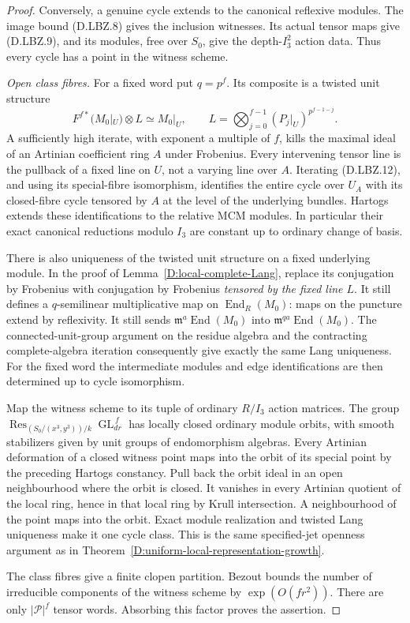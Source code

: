 \begin{proof}
Conversely, a genuine cycle extends to the
canonical reflexive modules.  The image bound
(D.LBZ.8) gives the inclusion witnesses.
Its actual tensor maps give (D.LBZ.9), and
its modules, free over $S_0$, give the
depth-$I_3^2$ action data.  Thus every cycle
has a point in the witness scheme.

\emph{Open class fibres.}
For a fixed word put $q=p^f$.  Its composite is
a twisted unit structure
\[
           F^{f*}(M_0|_U)\otimes L\simeq M_0|_U,
 \qquad
 L=\bigotimes_{j=0}^{f-1}(P_j|_U)^{p^{f-1-j}}.            \tag{D.LBZ.12}
\]
A sufficiently high iterate, with exponent a
multiple of $f$, kills the maximal ideal of
an Artinian coefficient ring $A$ under
Frobenius.  Every intervening tensor line
is the pullback of a fixed line on $U$,
not a varying line over $A$.  Iterating
(D.LBZ.12), and using its special-fibre
isomorphism, identifies the entire cycle
over $U_A$ with its closed-fibre cycle
tensored by $A$ at the level of the
underlying bundles.  Hartogs extends
these identifications to the relative
MCM modules.  In particular their exact
canonical reductions modulo $I_3$ are
constant up to ordinary change of basis.

There is also uniqueness of the twisted
unit structure on a fixed underlying
module.  In the proof of
Lemma~\ref{D:local-complete-Lang},
replace its conjugation by Frobenius
with conjugation by Frobenius
\emph{tensored by the fixed line $L$}.
It still defines a $q$-semilinear
multiplicative map on
$\operatorname{End}_R(M_0)$: maps on
the puncture extend by reflexivity.
It still sends
$\mathfrak m^a\operatorname{End}(M_0)$
into $\mathfrak m^{qa}\operatorname{End}(M_0)$.
The connected-unit-group argument on
the residue algebra and the contracting
complete-algebra iteration consequently
give exactly the same Lang uniqueness.
For the fixed word the intermediate
modules and edge identifications are
then determined up to cycle isomorphism.

Map the witness scheme to its tuple of
ordinary $R/I_3$ action matrices.
The group
$\operatorname{Res}_{(S_0/(x^3,y^3))/k}
          \operatorname{GL}_{dr}^{\,f}$
has locally closed ordinary module
orbits, with smooth stabilizers given
by unit groups of endomorphism algebras.
Every Artinian deformation of a closed
witness point maps into the orbit of
its special point by the preceding
Hartogs constancy.  Pull back the orbit
ideal in an open neighbourhood where
the orbit is closed.  It vanishes in
every Artinian quotient of the local
ring, hence in that local ring by
Krull intersection.  A neighbourhood
of the point maps into the orbit.
Exact module realization and twisted
Lang uniqueness make it one cycle
class.  This is the same specified-jet
openness argument as in
Theorem~\ref{D:uniform-local-representation-growth}.

The class fibres give a finite clopen
partition.  Bezout bounds the number
of irreducible components of the
witness scheme by $\exp(O(fr^2))$.
There are only $|\mathscr P|^f$
tensor words.  Absorbing this factor
proves the assertion.
\end{proof}

